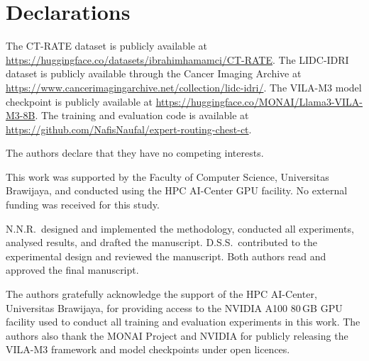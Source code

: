 \documentclass[lineno,referee,pdflatex,sn-mathphys-num]{sn-jnl}
\begin{document}
\section*{Declarations}

The CT-RATE dataset is publicly available at
\url{https://huggingface.co/datasets/ibrahimhamamci/CT-RATE}.
The LIDC-IDRI dataset is publicly available through the Cancer Imaging
Archive at \url{https://www.cancerimagingarchive.net/collection/lidc-idri/}.
The VILA-M3 model checkpoint is publicly available at
\url{https://huggingface.co/MONAI/Llama3-VILA-M3-8B}.
The training and evaluation code is available at
\url{https://github.com/NafisNaufal/expert-routing-chest-ct}.

The authors declare that they have no competing interests.

This work was supported by the Faculty of Computer Science, Universitas
Brawijaya, and conducted using the HPC AI-Center GPU facility.
No external funding was received for this study.

N.N.R.\ designed and implemented the methodology, conducted all
experiments, analysed results, and drafted the manuscript.
D.S.S.\ contributed to the experimental design and reviewed the
manuscript. Both authors read and approved the final manuscript.


The authors gratefully acknowledge the support of the HPC AI-Center,
Universitas Brawijaya, for providing access to the NVIDIA A100 80\,GB GPU
facility used to conduct all training and evaluation experiments in this
work. The authors also thank the MONAI Project and NVIDIA for publicly
releasing the VILA-M3 framework and model checkpoints under open licences.
\end{document}
